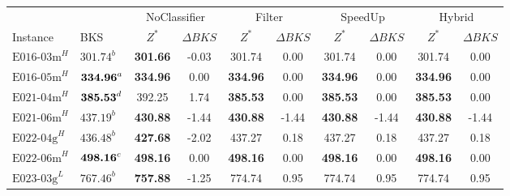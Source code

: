 \begin{table}[ht]
	\centering
	\scriptsize
	\renewcommand{\arraystretch}{1.02}
	\begin{tabular}{@{}llcccccccc@{}}
		\toprule
		                    &                             & \multicolumn{2}{c}{NoClassifier} & \multicolumn{2}{c}{Filter} & \multicolumn{2}{c}{SpeedUp} & \multicolumn{2}{c}{Hybrid}                                                                    \\ \cmidrule(lr){3-4}\cmidrule(lr){5-6}\cmidrule(lr){7-8}\cmidrule(lr){9-10}
		Instance            & BKS                         & $Z^*$                            & $\Delta BKS$               & $Z^*$                       & $\Delta BKS$               & $Z^*$            & $\Delta BKS$ & $Z^*$           & $\Delta BKS$ \\
		\midrule
		$\text{E016-03m}^H$ & $\text{301.74}^b$           & \textbf{301.66}                  & -0.03                      & 301.74                      & 0.00                       & 301.74           & 0.00         & 301.74          & 0.00         \\
		$\text{E016-05m}^H$ & $\text{\textbf{334.96}}^a$  & \textbf{334.96}                  & 0.00                       & \textbf{334.96}             & 0.00                       & \textbf{334.96}  & 0.00         & \textbf{334.96} & 0.00         \\
		$\text{E021-04m}^H$ & $\text{\textbf{385.53}}^d$  & 392.25                           & 1.74                       & \textbf{385.53}             & 0.00                       & \textbf{385.53}  & 0.00         & \textbf{385.53} & 0.00         \\
		$\text{E021-06m}^H$ & $\text{437.19}^b$           & \textbf{430.88}                  & -1.44                      & \textbf{430.88}             & -1.44                      & \textbf{430.88}  & -1.44        & \textbf{430.88} & -1.44        \\
		$\text{E022-04g}^H$ & $\text{436.48}^b$           & \textbf{427.68}                  & -2.02                      & 437.27                      & 0.18                       & 437.27           & 0.18         & 437.27          & 0.18         \\
		$\text{E022-06m}^H$ & $\text{\textbf{498.16}}^c$  & \textbf{498.16}                  & 0.00                       & \textbf{498.16}             & 0.00                       & \textbf{498.16}  & 0.00         & \textbf{498.16} & 0.00         \\
		$\text{E023-03g}^L$ & $\text{767.46}^b$           & \textbf{757.88}                  & -1.25                      & 774.74                      & 0.95                       & 774.74           & 0.95         & 774.74          & 0.95         \\

\end{tabular}
\end{table}
